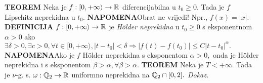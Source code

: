 \documentclass{article}
\begin{document}
\textbf{TEOREM}\newline
Neka je \(f:[0,+\infty\rangle\to\Bbb R\) diferencijabilna u \(t_0\ge0.\) Tada je \(f\) Lipschitz neprekidna u \(t_0.\)\newline\newline
{}\textbf{NAPOMENA}\newline Obrat ne vrijedi! Npr., \(f(x)=|x|.\)\newline\newline
\textbf{DEFINICIJA}\newline
\(f:[0,+\infty\rangle\to\Bbb R\) je \emph{H\"older neprekidna} u \(t_0\ge0\) s eksponentnom \(\alpha>0\) ako \(\exists\delta>0,\exists c>0,\forall t\in[0,+\infty\rangle,|t-t_0|<\delta\Rightarrow|f(t)-f(t_0)|\le C|t-t_0|^\alpha.\)\newline\newline
{}\textbf{NAPOMENA}\newline Ako je \(f\) H\"older neprekidna s eksponentom \(\alpha>0,\) onda je H\"older neprekidna i s eksponentom \(\beta>\alpha,\forall \beta>\alpha.\)\newline\newline
\textbf{TEOREM}\newline 
Neka je \(T<+\infty.\) Tada je \(\nu\)-g. s.  \(\omega:\Bbb Q_2\to\Bbb R\) uniformno neprekidna na \(\Bbb Q_2\cap[0,2].\)\newline\newline
\textit{Dokaz.}\newline
\end{document}
